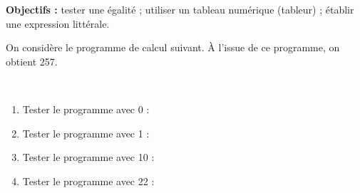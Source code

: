 \activites

\begin{activite}
   {\bf Objectifs :} tester une égalité ; utiliser un tableau numérique (tableur) ; établir une expression littérale.
   \begin{QCM}
      On considère le programme de calcul suivant. À l'issue de ce programme, on obtient 257.
      \begin{center}
      \end{center}
      
      \ \\ [-10mm]
         \begin{enumerate}
            \item Tester le programme avec 0 : \pfb \smallskip
            \item Tester le programme avec 1 : \pfb \smallskip
            \item Tester le programme avec 10 : \pfb \smallskip
            \item Tester le programme avec 22 : \pfb \bigskip
         \end{enumerate}


\end{QCM}
\end{activite}
